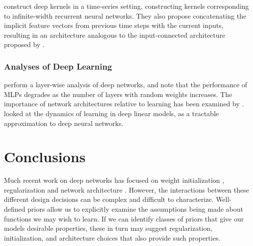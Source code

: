 
\cite{hermans2012recurrent} construct deep kernels in a time-series setting, constructing kernels corresponding to infinite-width recurrent neural networks.%
They also propose concatenating the implicit feature vectors from previous time steps with the current inputs, resulting in an architecture analogous to the input-connected architecture proposed by \citet{neal1995bayesian}.

\subsubsection{Analyses of Deep Learning}
\cite{montavon2010layer} perform a layer-wise analysis of deep networks, and note that the performance of MLPs degrades as the number of layers with random weights increases.
The importance of network architectures relative to learning has been examined by \cite{saxe2011random}.
\cite{saxedynamics} looked at the dynamics of learning in deep linear models, as a tractable approximation to deep neural networks.  








\section{Conclusions}

Much recent work on deep networks has focused on weight initialization \citep{martens2010deep}, regularization \citep{lee2007sparse} and network architecture \citep{gens2013learning}.
However, the interactions between these different design decisions can be complex and difficult to characterize.
Well-defined priors allow us to explicitly examine the assumptions being made about functions we may wish to learn.
If we can identify classes of priors that give our models desirable properties, these in turn may suggest regularization, initialization, and architecture choices that also provide such properties.


